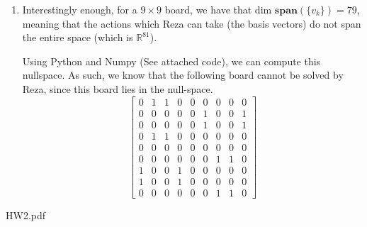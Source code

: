 \documentclass[12pt]{exam}
\begin{document}
\begin{questions}
\begin{solution}
\begin{enumerate}[label=(\alph*)]
      \item Interestingly enough, for a $9 \times 9$ board, we have that $\text{dim }\textbf{span}(\{v_k\}) = 79$, meaning that the actions which Reza can take (the basis vectors) do not span the entire space (which is $\mathbb{R}^{81}$). 

      Using Python and Numpy (See attached code), we can compute this nullspace. As such, we know that the following board cannot be solved by Reza, since this board lies in the null-space.
      \[
        \begin{bmatrix}
           0 & 1 & 1 & 0 & 0 & 0 & 0 & 0 & 0 \\
           0 & 0 & 0 & 0 & 0 & 1 & 0 & 0 & 1 \\
           0 & 0 & 0 & 0 & 0 & 1 & 0 & 0 & 1 \\
           0 & 1 & 1 & 0 & 0 & 0 & 0 & 0 & 0 \\
           0 & 0 & 0 & 0 & 0 & 0 & 0 & 0 & 0 \\
           0 & 0 & 0 & 0 & 0 & 0 & 1 & 1 & 0 \\
           1 & 0 & 0 & 1 & 0 & 0 & 0 & 0 & 0 \\
           1 & 0 & 0 & 1 & 0 & 0 & 0 & 0 & 0 \\
           0 & 0 & 0 & 0 & 0 & 0 & 1 & 1 & 0
       \end{bmatrix}
      \]
  \end{enumerate}
\end{solution}


\end{questions}



{HW2.pdf}
\end{document}
